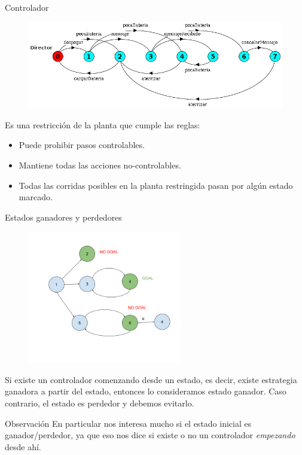 \begin{frame}{Controlador}
    \begin{figure}
     \includegraphics[width=\textwidth]{figures/director.png}
    \end{figure}

    Es una restricción de la planta que cumple las reglas:

    \begin{itemize}
     \item Puede prohibir pasos controlables.
     \item Mantiene todas las acciones no-controlables.
     \item Todas las corridas posibles en la planta restringida pasan por algún estado marcado.
    \end{itemize}
\end{frame}
\begin{frame}{Estados ganadores y perdedores}
	
	\begin{figure}
		\vspace{-1cm}
		\hspace{-0.8cm}
		\includegraphics[width=0.6\textwidth]{figures/como-marcar-goals-FACAS.png}
	\end{figure}
	
    Si existe un controlador comenzando desde un estado, es decir, existe estrategia ganadora a partir del estado, entonces lo consideramos estado ganador. 
    Caso contrario, el estado es perdedor y debemos evitarlo.
    
    \vspace{0.5cm}
    \begin{block}{Observación}
        En particular nos interesa mucho si el estado inicial es ganador/perdedor, ya que eso nos dice si existe o no un controlador \textit{empezando} desde ahí.
    \end{block}

\end{frame}
